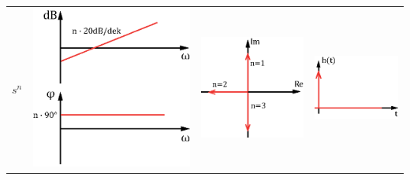 \begin{tabular}{>{\centering\arraybackslash}p{1.5cm}|>{\centering\arraybackslash}p{2.5cm}|>{\centering\arraybackslash}p{2cm}|>{\centering\arraybackslash}p{2.5cm}}
\hline \rule[-2ex]{0pt}{5.5ex} $s^n$ & \includegraphics[scale = 0.3]{images/bode_sn.eps} & \includegraphics[scale = 0.4]{images/ort_sn.eps}  & \includegraphics[scale = 0.5]{images/spr_sn.eps}  \\ 

\end{tabular}
